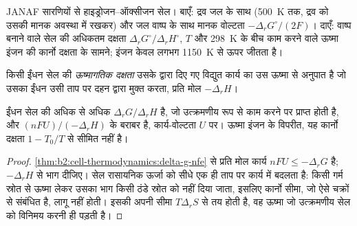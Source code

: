 \begin{omfigure}
{\small JANAF सारणियों से हाइड्रोजन--ऑक्सीजन सेल। बाएँ: द्रव जल के साथ
(\qty{500}{K} तक, द्रव को उसकी मानक अवस्था में रखकर) और जल वाष्प के साथ मानक वोल्टता
$-\Delta_r G^\circ/(2F)$। दाएँ: वाष्प बनाने वाले सेल की अधिकतम दक्षता
$\Delta_r G^\circ/\Delta_r H^\circ$, $T$ और \qty{298}{K} के बीच काम करने वाले
ऊष्मा इंजन की कार्नो दक्षता के सामने; इंजन
केवल लगभग \qty{1150}{K} से ऊपर जीतता है।}
\end{omfigure}

\begin{definition}[ईंधन सेल की ऊष्मागतिक दक्षता]\label{def:b2:cell-thermodynamics:efficiency}
किसी ईंधन सेल की \emph{ऊष्मागतिक दक्षता}
उसके द्वारा दिए गए विद्युत कार्य का उस ऊष्मा से अनुपात है जो उसका ईंधन
उसी ताप पर दहन द्वारा मुक्त करता, प्रति मोल $-\Delta_r H$।
\end{definition}

\begin{proposition}[ईंधन सेल की अधिकतम दक्षता]\label{prop:b2:cell-thermodynamics:efficiency}
ईंधन सेल की  अधिक से अधिक $\Delta_r G/\Delta_r H$ है,
जो उत्क्रमणीय रूप से काम करने पर प्राप्त होती है, और $(nFU)/(-\Delta_r H)$ के बराबर है,
कार्य-वोल्टता $U$ पर। ऊष्मा इंजन के विपरीत, यह कार्नो दक्षता
$1 - T_0/T$ से सीमित नहीं है।
\end{proposition}

\begin{proof}
\cref{thm:b2:cell-thermodynamics:delta-g-nfe} से प्रति मोल कार्य $nFU \leq
-\Delta_r G$ है; $-\Delta_r H$ से भाग दीजिए। सेल रासायनिक ऊर्जा को सीधे
एक ही ताप पर कार्य में बदलता है: किसी गर्म स्रोत से ऊष्मा लेकर उसका
भाग किसी ठंडे स्रोत को नहीं दिया जाता, इसलिए कार्नो सीमा, जो ऐसे चक्रों से संबंधित है,
लागू नहीं होती। इसकी अपनी सीमा $T\Delta_r S$ से तय होती है, वह ऊष्मा जो उत्क्रमणीय
सेल को विनिमय करनी ही पड़ती है।
\end{proof}

